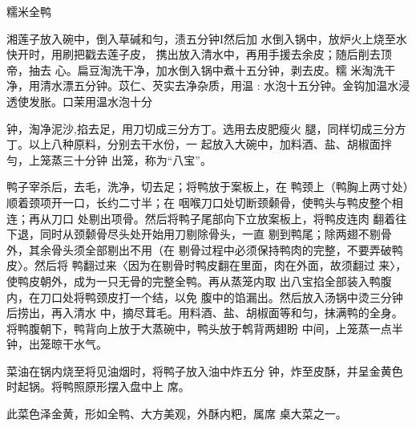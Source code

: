 \begin{recipe}[八宝全鸭]{糯米全鸭}

\ingredients


\cooking

湘莲子放入碗中，倒入草碱和勻，渍五分钟I然后加 水倒入锅中，放炉火上烧至水快开时，用刷把戳去莲子皮， 携出放入清水中，再用手援去余皮；随后削去顶帝，抽去 心。扁豆淘洗干净，加水倒入锅中煮十五分钟，剥去皮。糯 米淘洗干净，用清水漂五分钟。苡仁、芡实去净杂质，用温 : 水泡十五分钟。金钩加温水浸透使发胀。口茉用温水泡十分

钟，淘净泥沙,掐去足，用刀切成三分方丁。选用去皮肥瘦火 腿，同样切成三分方丁。以上八种原料，分别去干水份，一 起放入大碗中，加料酒、盐、胡椒面拌勻，上笼蒸三十分钟 出笼，称为“八宝”。

\step 	鸭子宰杀后，去毛，洗净，切去足；将鸭放于案板上，在 鸭颈上（鸭胸上两寸处）顺着颈项开一口，长约二寸半；在 咽喉刀口处切断颈颡骨，使鸭头与鸭皮整个相连；再从刀口 处剔出项骨。然后将鸭子尾部向下立放案板上，将鸭皮连肉 翻着往下退，同时从颈颡骨尽头处开始用刀剔除骨头，一直 剔到鸭尾；除两翅不剔骨外，其余骨头须全部剔出不用（在 剔骨过程中必须保持鸭肉的完整，不要弄破鸭皮〉。然后将 鸭翻过来〈因为在剔骨时鸭皮翻在里面，肉在外面，故须翻过 来〉，使鸭皮朝外，成为一只无骨的完整全鸭。再从蒸笼内取 出八宝掐全部装入鸭腹内，在刀口处将鸭颈皮打一个结，以免 腹中的馅漏出。然后放入汤锅中烫三分钟后捞出，再入清水 中，摘尽茸毛。用料酒、盐、胡椒面等和匀，抹满鸭的全身。 将鸭腹朝下，鸭背向上放于大蒸碗中，鸭头放于鹎背两翅盼 中间，上笼蒸一点半钟，出笼晾干水气。

\step 	菜油在锅内烧至将见油烟时，将鸭子放入油中炸五分 钟，炸至皮酥，并呈金黄色时起锅。将鸭照原形摆入盘中上 席。

\notes

此菜色泽金黄，形如全鸭、大方美观，外酥内粑，属席 桌大菜之一。

\end{recipe}

